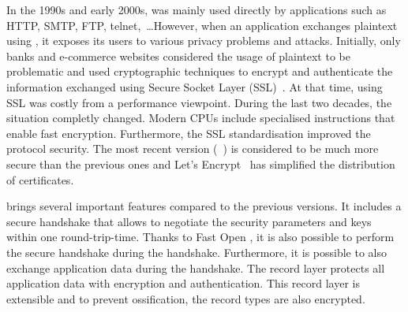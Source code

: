 In the 1990s and early 2000s, \tcp was mainly used directly by applications such
as HTTP, SMTP, FTP, telnet,~\ldots However, when an application exchanges
plaintext using \tcp, it exposes its users to various privacy problems and
attacks. Initially, only banks and e-commerce websites considered the usage of
plaintext to be problematic and used cryptographic techniques to encrypt and
authenticate the information exchanged using Secure Socket Layer
(SSL)~\cite{draft-hickman-netscape-ssl}. At that time, using SSL was costly from
a performance viewpoint. During the last two decades, the situation completly
changed. Modern CPUs include specialised instructions that enable fast
encryption. Furthermore, the SSL standardisation improved the protocol security.
The most recent version (~\cite{rfc8446}) is considered to be much more
secure than the previous ones and Let's Encrypt~\cite{aas2019let} has
simplified the distribution of certificates.


 brings several important features compared to the previous versions. It
includes a secure handshake that allows to negotiate the security parameters and
keys within one round-trip-time. Thanks to \tcp Fast Open
\cite{radhakrishnan2011tcp}, it is also possible to perform the secure handshake
during the \tcp handshake. Furthermore, it is possible to also exchange
application data during the handshake. The  record layer protects all
application data with encryption and authentication. This record layer is
extensible and to prevent ossification, the \tls record types are also
encrypted.





